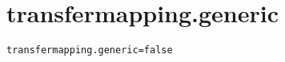 \section{transfermapping.generic}
\label{configuration:TransfermappingGeneric}
\AvailableInJavaOnly{\TODO}
\begin{lstlisting}[style=Props,caption={Usage example for \textit{transfermapping.generic}}]
transfermapping.generic=false
\end{lstlisting}